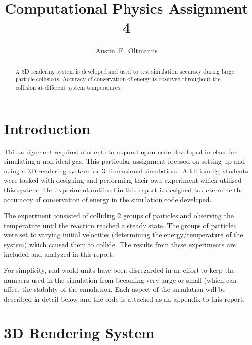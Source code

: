 \documentclass{article}
\begin{document}
\title{Computational Physics Assignment 4}
\author{Austin~F.~Oltmanns}

\maketitle

\begin{abstract}
A 3D rendering system is developed and used to test simulation accuracy during large particle collisions. Accuracy
of conservation of energy is observed throughout the collision at different system temperatures.
\end{abstract} 

\section{Introduction}
This assignment required students to expand upon code developed in class for simulating a non-ideal gas.
This particular assignment focused on setting up and using a 3D rendering system for 3 dimensional simulations.
Additionally, students were tasked with designing and performing their own experiment which utilized this system. 
The experiment outlined in this report is designed to determine the accuraccy of conservation of energy in 
the simulation code developed.

The experiment consisted of colliding 2 groups of particles and observing the temperature until the reaction reached
a steady state. The groups of particles were set to varying initial velocities (determining the energy/temperature of
the system) which caused them to collide. The results from these experiments are included and analyzed in this report.

For simplicity, real world units have been disregarded in an effort to keep the numbers used in the simulation from 
becoming very large or small (which can affect the stability of the simulation.
Each aspect of the simulation will be described in detail below and the code is attached as an appendix to this report.

\section{3D Rendering System}
\end{document}
